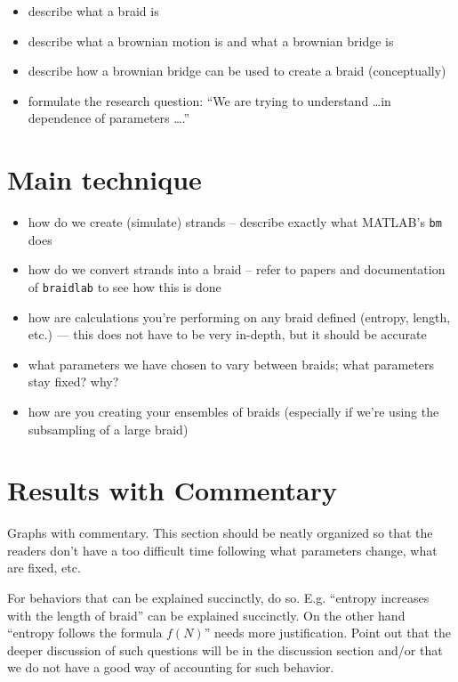 \documentclass{amsart}
\begin{document}
\begin{itemize}
\item describe what a braid is
\item describe what a brownian motion is and what a brownian bridge is
\item describe how a brownian bridge can be used to create a braid (conceptually)
\item formulate the research question: ``We are trying to understand \dots in dependence of parameters \dots.''
\end{itemize}

\section{Main technique}

\begin{itemize}
\item how do we create (simulate) strands -- describe exactly what MATLAB's \texttt{bm} does
\item how do we convert strands into a braid -- refer to papers and documentation of \texttt{braidlab} to see how this is done
\item how are calculations you're performing on any braid defined (entropy, length, etc.) --- this does not have to be very in-depth, but it should be accurate
\item what parameters we have chosen to vary between braids; what parameters stay fixed? why?
\item how are you creating your ensembles of braids (especially if we're using the subsampling of a large braid)
\end{itemize}

\section{Results with Commentary}

Graphs with commentary. This section should be neatly organized so that the readers don't have a too difficult time following what parameters change, what are fixed, etc.

For behaviors that can be explained succinctly, do so. E.g. ``entropy increases with the length of braid'' can be explained succinctly. On the other hand ``entropy follows the formula \(f(N)\)'' needs more justification. Point out that the deeper discussion of such questions will be in the discussion section and/or that we do not have a good way of accounting for such behavior.
\end{document}
